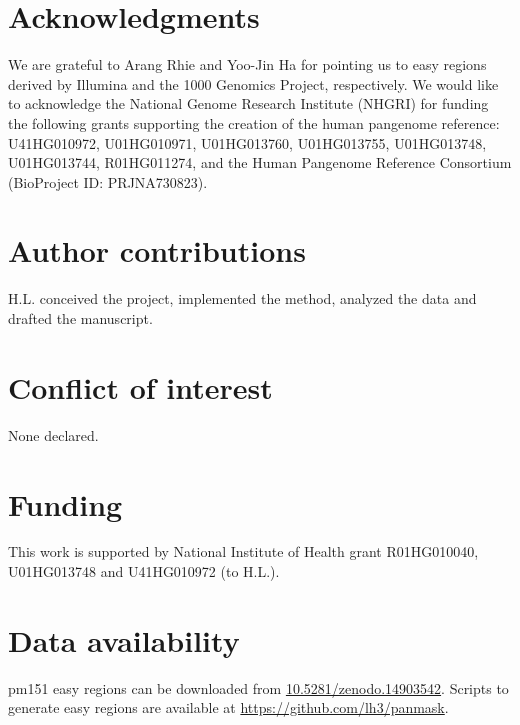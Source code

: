 \documentclass[webpdf,contemporary,large,namedate]{oup-authoring-template}%
\begin{document}
\section*{Acknowledgments}

We are grateful to Arang Rhie and Yoo-Jin Ha for pointing us to easy regions
derived by Illumina and the 1000 Genomics Project, respectively.
We would like to acknowledge the National Genome Research Institute (NHGRI) for
funding the following grants supporting the creation of the human pangenome
reference: U41HG010972, U01HG010971, U01HG013760, U01HG013755, U01HG013748,
U01HG013744, R01HG011274, and the Human Pangenome Reference Consortium
(BioProject ID: PRJNA730823).

\section*{Author contributions}

H.L. conceived the project, implemented the method, analyzed the data and drafted the manuscript.

\section*{Conflict of interest}

None declared.

\section*{Funding}

This work is supported by National Institute of Health grant R01HG010040, U01HG013748 and U41HG010972 (to H.L.).

\section*{Data availability}

pm151 easy regions can be downloaded from \url{10.5281/zenodo.14903542}. Scripts to generate easy regions are available at \url{https://github.com/lh3/panmask}.


{\sffamily\small
}
\end{document}
